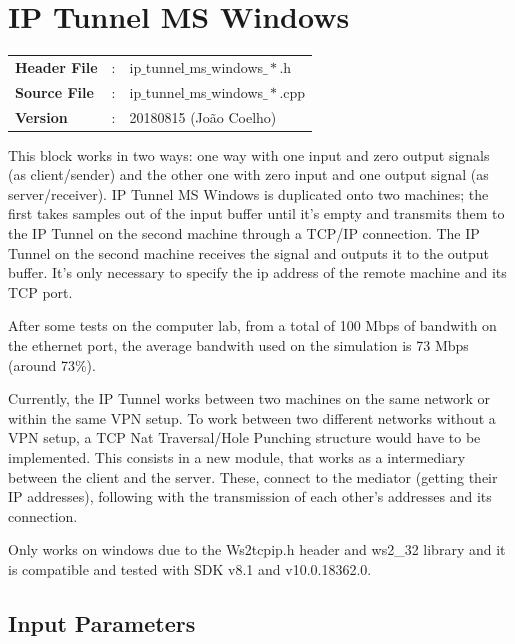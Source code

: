 \clearpage


\section{IP Tunnel MS Windows}

\begin{tcolorbox}	
	\begin{tabular}{p{2.75cm} p{0.2cm} p{10.5cm}} 	
		\textbf{Header File}   &:& ip$\_$tunnel$\_$ms$\_$windows$\_*$.h \\
		\textbf{Source File}   &:& ip$\_$tunnel$\_$ms$\_$windows$\_*$.cpp \\
        \textbf{Version}       &:& 20180815 (Jo\~ao Coelho) \\
	\end{tabular}
\end{tcolorbox}

This block works in two ways: one way with one input and zero output signals (as client/sender) and the other one with zero input and one output signal (as server/receiver).
IP Tunnel MS Windows is duplicated onto two machines; the first takes samples out of the input buffer until it's empty and transmits them to the IP Tunnel on the second machine through a TCP/IP connection. The IP Tunnel on the second machine receives the signal and outputs it to the output buffer.
It's only necessary to specify the ip address of the remote machine and its TCP port. \par
After some tests on the computer lab, from a total of 100 Mbps of bandwith on the ethernet port, the average bandwith used on the simulation is 73 Mbps (around 73\%). 
\par
Currently, the IP Tunnel works between two machines on the same network or within the same VPN setup.
To work between two different networks without a VPN setup, a TCP Nat Traversal/Hole Punching structure would have to be implemented. This consists in a new module, that works as a intermediary between the client and the server. These, connect to the mediator (getting their IP addresses), following with the transmission of each other's addresses and its connection.
\par
Only works on windows due to the Ws2tcpip.h header and ws2\_32 library and it is compatible and tested with SDK v8.1 and v10.0.18362.0.

\subsection*{Input Parameters}

